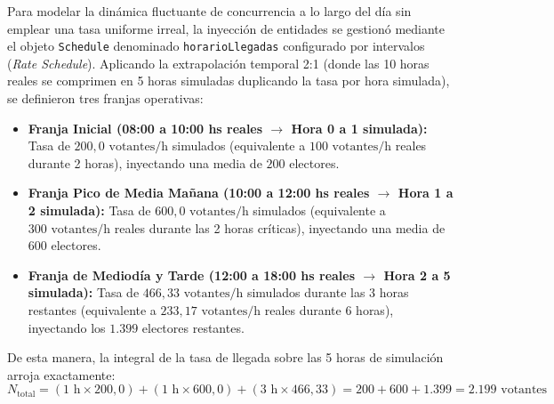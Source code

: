 \documentclass[11pt,a4paper]{article}
\begin{document}
Para modelar la dinámica fluctuante de concurrencia a lo largo del día sin emplear una tasa uniforme irreal, la inyección de entidades se gestionó mediante el objeto \texttt{Schedule} denominado \texttt{horarioLlegadas} configurado por intervalos (\textit{Rate Schedule}). Aplicando la extrapolación temporal 2:1 (donde las 10 horas reales se comprimen en 5 horas simuladas duplicando la tasa por hora simulada), se definieron tres franjas operativas:
\begin{itemize}
    \item \textbf{Franja Inicial (08:00 a 10:00 hs reales $\rightarrow$ Hora 0 a 1 simulada):} Tasa de $200{,}0\text{ votantes/h}$ simulados (equivalente a $100\text{ votantes/h}$ reales durante 2 horas), inyectando una media de $200$ electores.
    \item \textbf{Franja Pico de Media Mañana (10:00 a 12:00 hs reales $\rightarrow$ Hora 1 a 2 simulada):} Tasa de $600{,}0\text{ votantes/h}$ simulados (equivalente a $300\text{ votantes/h}$ reales durante las 2 horas críticas), inyectando una media de $600$ electores.
    \item \textbf{Franja de Mediodía y Tarde (12:00 a 18:00 hs reales $\rightarrow$ Hora 2 a 5 simulada):} Tasa de $466{,}33\text{ votantes/h}$ simulados durante las 3 horas restantes (equivalente a $233{,}17\text{ votantes/h}$ reales durante 6 horas), inyectando los $1.399$ electores restantes.
\end{itemize}
De esta manera, la integral de la tasa de llegada sobre las 5 horas de simulación arroja exactamente:
\begin{equation}
    N_{\text{total}} = (1\text{ h} \times 200{,}0) + (1\text{ h} \times 600{,}0) + (3\text{ h} \times 466{,}33) = 200 + 600 + 1.399 = 2.199\text{ votantes}
\end{equation}
\end{document}
